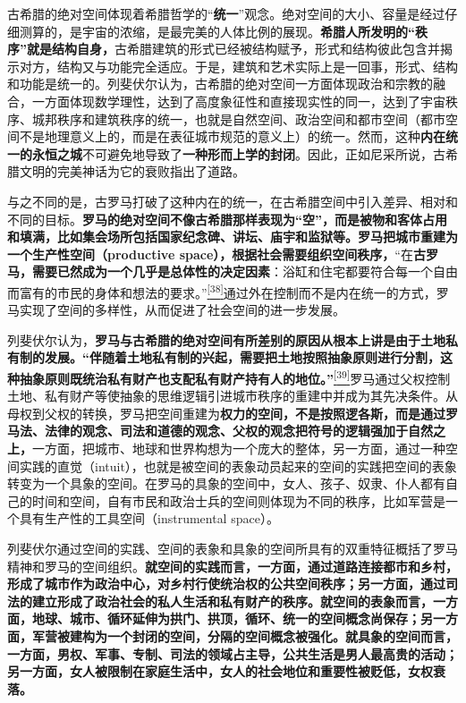 \documentclass[UTF8, fontset = sourcesans, a4paper, oneside, zihao =
-4, scheme=chinese, no-math, space=true]{ctexbook}
\begin{document}
古希腊的绝对空间体现着希腊哲学的``\textbf{统一}''观念。绝对空间的大小、容量是经过仔细测算的，是宇宙的浓缩，是最完美的人体比例的展现。\textbf{希腊人所发明的``秩序''就是结构自身，}古希腊建筑的形式已经被结构赋予，形式和结构彼此包含并揭示对方，结构又与功能完全适应。于是，建筑和艺术实际上是一回事，形式、结构和功能是统一的。列斐伏尔认为，古希腊的绝对空间一方面体现政治和宗教的融合，一方面体现数学理性，达到了高度象征性和直接现实性的同一，达到了宇宙秩序、城邦秩序和建筑秩序的统一，也就是自然空间、政治空间和都市空间（都市空间不是地理意义上的，而是在表征城市规范的意义上）的统一。然而，这种\textbf{内在统一的永恒之城}不可避免地导致了\textbf{一种形而上学的封闭}。因此，正如尼采所说，古希腊文明的完美神话为它的衰败指出了道路。

与之不同的是，古罗马打破了这种内在的统一，在古希腊空间中引入差异、相对和不同的目标。\textbf{罗马的绝对空间不像古希腊那样表现为``空''，而是被物和客体占用和填满，比如集会场所包括国家纪念碑、讲坛、庙宇和监狱等。罗马把城市重建为一个生产性空间（productive
space），根据社会需要组织空间秩序，}``在\textbf{古罗马，需要已然成为一个几乎是总体性的决定因素}：浴缸和住宅都要符合每一个自由而富有的市民的身体和想法的要求。''\protect\hypertarget{part0006_split_003.htmlux5cux23w38}{}{}\protect\hyperlink{part0006_split_003.htmlux5cux23m38}{\textsuperscript{{[}38{]}}}通过外在控制而不是内在统一的方式，罗马实现了空间的多样性，从而促进了社会空间的进一步发展。

列斐伏尔认为，\textbf{罗马与古希腊的绝对空间有所差别的原因从根本上讲是由于土地私有制的发展。``伴随着土地私有制的兴起，需要把土地按照抽象原则进行分割，这种抽象原则既统治私有财产也支配私有财产持有人的地位。''}\protect\hypertarget{part0006_split_003.htmlux5cux23w39}{}{}\protect\hyperlink{part0006_split_003.htmlux5cux23m39}{\textsuperscript{{[}39{]}}}罗马通过父权控制土地、私有财产等使抽象的思维逻辑引进城市秩序的重建中并成为其先决条件。从母权到父权的转换，罗马把空间重建为\textbf{权力的空间，不是按照逻各斯，而是通过罗马法、法律的观念、司法和道德的观念、父权的观念把符号的逻辑强加于自然之上，}一方面，把城市、地球和世界构想为一个庞大的整体，另一方面，通过一种空间实践的直觉（intuit），也就是被空间的表象动员起来的空间的实践把空间的表象转变为一个具象的空间。在罗马的具象的空间中，女人、孩子、奴隶、仆人都有自己的时间和空间，自有市民和政治士兵的空间则体现为不同的秩序，比如军营是一个具有生产性的工具空间（instrumental
space）。

列斐伏尔通过空间的实践、空间的表象和具象的空间所具有的双重特征概括了罗马精神和罗马的空间组织。\textbf{就空间的实践而言，一方面，通过道路连接都市和乡村，形成了城市作为政治中心，对乡村行使统治权的公共空间秩序；另一方面，通过司法的建立形成了政治社会的私人生活和私有财产的秩序。就空间的表象而言，一方面，地球、城市、循环延伸为拱门、拱顶，循环、统一的空间概念尚保存；另一方面，军营被建构为一个封闭的空间，分隔的空间概念被强化。就具象的空间而言，一方面，男权、军事、专制、司法的领域占主导，公共生活是男人最高贵的活动；另一方面，女人被限制在家庭生活中，女人的社会地位和重要性被贬低，女权衰落。}
\end{document}
